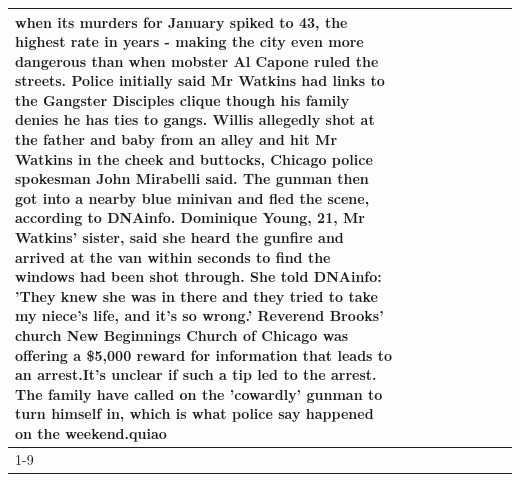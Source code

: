 \begin{table}[H]
\begin{tabular}{lllrlllll}
when its murders for January spiked to 43, the highest rate in years - making the city even more dangerous than when mobster Al Capone ruled the streets. Police initially said Mr Watkins had links to the Gangster Disciples clique though his family denies he has ties to gangs. Willis allegedly shot at the father and baby from an alley and hit Mr Watkins in the cheek and buttocks, Chicago police spokesman John Mirabelli said. The gunman then got into a nearby blue minivan and fled the scene, according to DNAinfo. Dominique Young, 21, Mr Watkins' sister, said she heard the gunfire and arrived at the van within seconds to find the windows had been shot through. She told DNAinfo: 'They knew she was in there and they tried to take my niece's life, and it's so wrong.' Reverend Brooks' church New Beginnings Church of Chicago was offering a \$5,000 reward for information that leads to an arrest.It's unclear if such a tip led to the arrest. The family have called on the 'cowardly' gunman to turn himself in, which is what police say happened on the weekend.quiao \\
\cline{1-9}

\end{tabular}
\end{table}
